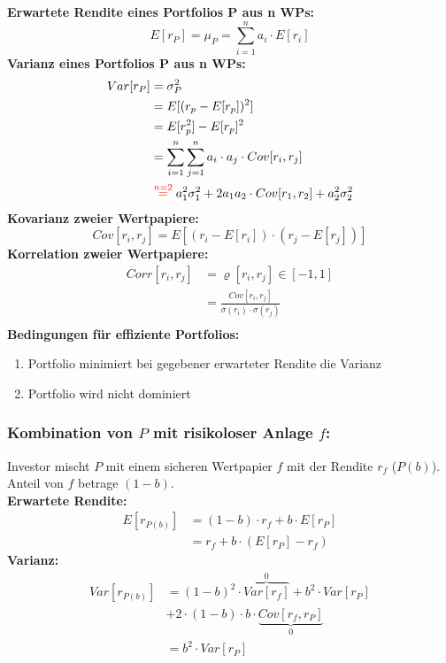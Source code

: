 \documentclass[leqno]{scrartcl}
\begin{document}
\begin{multicols}{3}
\textbf{Erwartete Rendite eines Portfolios P aus n WPs:}
  \begin{equation}
    E[r_P] =\mu_P= \sum^{n}_{i=1} a_i \cdot E[r_i]
  \end{equation}
\textbf{Varianz eines Portfolios P aus n WPs:}
  \begin{equation}
    \begin{split}
      Var[r_P]&=\sigma_P^2\\
          &=E[(r_p-E[r_p])^2]\\
          &=E[r_p^2]-E[r_p]^2\\
          &=\sum^{n}_{i=1}\sum^{n}_{j=1}a_i \cdot a_j \cdot Cov[r_i,r_j]\\
          &\overset{\color{red}{n=2}}{=} a^2_1 \sigma^2_1 + 2a_1a_2 \cdot Cov[r_1,r_2] + a^2_2 \sigma^2_2
    \end{split}
  \end{equation}
\textbf{Kovarianz zweier Wertpapiere:}
  \begin{equation}
      Cov[r_i,r_j] = E[(r_i-E[r_i]) \cdot (r_j-E[r_j])]
  \end{equation}
\textbf{Korrelation zweier Wertpapiere:}
  \begin{equation}
    \begin{split}
      Corr[r_i,r_j] &= \varrho [r_i,r_j] \in [-1,1]\\
                    &= \frac{Cov[r_i,r_j]}{\sigma (r_i) \cdot \sigma (r_j)}\\
    \end{split}
  \end{equation}
\textbf{Bedingungen für effiziente Portfolios:}
  \begin{enumerate}
    \item Portfolio minimiert bei gegebener erwarteter Rendite die Varianz
    \item Portfolio wird nicht dominiert
  \end{enumerate}
\subsubsection{Kombination von $P$ mit risikoloser Anlage $f$:}
Investor mischt $P$ mit einem sicheren Wertpapier $f$ mit der Rendite $r_f$ ($P(b)$). Anteil von $f$ betrage $(1 - b)$.\\
\textbf{Erwartete Rendite:}
  \begin{equation}
    \begin{split}
      E[r_{P(b)}]&=(1-b) \cdot r_f + b \cdot E[r_P]\\
                 &=r_f + b \cdot (E[r_P ] - r_f)
    \end{split}
  \end{equation}
\textbf{Varianz:}
  \begin{equation}
    \begin{split}
      Var[r_{P(b)}] &= (1-b)^2 \cdot \overbrace{Var[r_f]}^{0}+ b^2 \cdot Var[r_P]\\
                  &+ 2 \cdot (1-b) \cdot b \cdot \underbrace{Cov[r_f ,r_P ]}_{0}\\
                  &= b^2 \cdot Var[r_P]
    \end{split}
  \end{equation}

\end{multicols}
\end{document}
